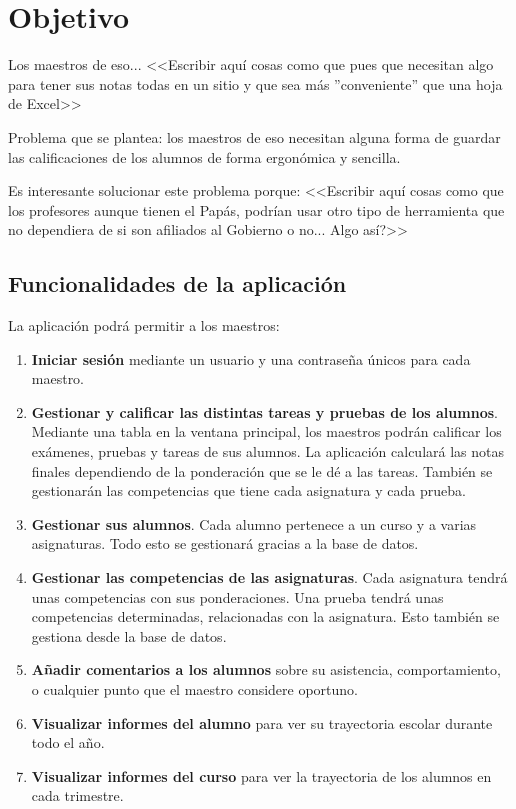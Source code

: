 \chapter{Objetivo}
\label{cap:Objetivo}

Los maestros de \gls{eso}... 
<<Escribir aquí cosas como que pues que necesitan algo para tener sus notas todas en un sitio y que sea más ''conveniente'' que una hoja de Excel>>

Problema que se plantea: los maestros de \gls{eso} necesitan alguna forma de guardar las calificaciones de los alumnos de forma ergonómica y sencilla.

Es interesante solucionar este problema porque: 
<<Escribir aquí cosas como que los profesores aunque tienen el Papás, podrían usar otro tipo de herramienta que no dependiera de si son afiliados al Gobierno o no... Algo así?>>

\section{Funcionalidades de la aplicación} \label{funcionalidades}

La aplicación podrá permitir a los maestros:
\begin{enumerate}
	\item \textbf{Iniciar sesión} mediante un usuario y una contraseña únicos para cada maestro.
	\item \textbf{Gestionar y calificar las distintas tareas y pruebas de los alumnos}. Mediante una tabla en la ventana principal, los maestros podrán calificar los exámenes, pruebas y tareas de sus alumnos. La aplicación calculará las notas finales dependiendo de la ponderación que se le dé a las tareas. También se gestionarán las competencias que tiene cada asignatura y cada prueba.
	\item \textbf{Gestionar sus alumnos}. Cada alumno pertenece a un curso y a varias asignaturas. Todo esto se gestionará gracias a la base de datos.
	\item \textbf{Gestionar las competencias de las asignaturas}. Cada asignatura tendrá unas competencias con sus ponderaciones. Una prueba tendrá unas competencias determinadas, relacionadas con la asignatura. Esto también se gestiona desde la base de datos.
	\item \textbf{Añadir comentarios a los alumnos} sobre su asistencia, comportamiento, o cualquier punto que el maestro considere oportuno.
	\item \textbf{Visualizar informes del alumno} para ver su trayectoria escolar durante todo el año.
	\item \textbf{Visualizar informes del curso} para ver la trayectoria de los alumnos en cada trimestre.
	

\end{enumerate}

